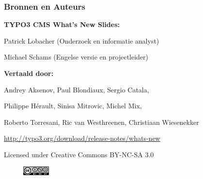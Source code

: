\begin{frame}[fragile]
	\frametitle{Bronnen en Auteurs}

	\centerline{\textbf{TYPO3 CMS What's New Slides:}}
	\centerline{Patrick Lobacher (Onderzoek en informatie analyst)}
	\centerline{Michael Schams (Engelse versie en projectleider)}

	\begin{center}
		\centerline{\textbf{Vertaald door:}}
		\centerline{Andrey Aksenov, Paul Blondiaux, Sergio Catala,}
		\centerline{Philippe Hérault, Sinisa Mitrovic, Michel Mix,}
		\centerline{Roberto Torresani, Ric van Westhreenen, Christiaan Wiesenekker}
	\end{center}

	\smaller\begin{center}\url{http://typo3.org/download/release-notes/whats-new}\end{center}\normalsize

	\smaller\begin{center}Licensed under Creative Commons BY-NC-SA 3.0\end{center}\normalsize
	\begin{figure}\vspace*{-0.2cm}
		\includegraphics[width=1.4cm]{Images/SourcesAndAuthors/CreativeCommons-BY-NC-SA.png}
	\end{figure}

\end{frame}


